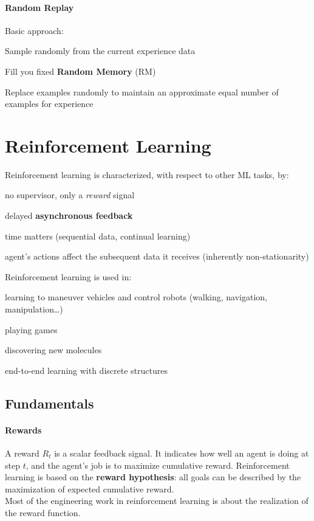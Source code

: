 \documentclass[10pt]{report}
\begin{document}
\paragraph{Random Replay} Basic approach:
\begin{list}{}{}
	\item Sample randomly from the current experience data
	\item Fill you fixed \textbf{Random Memory} (RM)
	\item Replace examples randomly to maintain an approximate equal number of examples for experience
\end{list}
\section{Reinforcement Learning}
Reinforcement learning is characterized, with respect to other ML tasks, by:
\begin{list}{}{}
	\item no supervisor, only a \textit{reward} signal
	\item delayed \textbf{asynchronous feedback}
	\item time matters (sequential data, continual learning)
	\item agent's actions affect the subsequent data it receives (inherently non-stationarity)
\end{list}
Reinforcement learning is used in:
\begin{list}{}{}
	\item learning to maneuver vehicles and control robots (walking, navigation, manipulation\ldots)
	\item playing games
	\item discovering new molecules
	\item end-to-end learning with discrete structures
\end{list}
\subsection{Fundamentals}
\paragraph{Rewards} A reward $R_t$ is a scalar feedback signal. It indicates how well an agent is doing at step $t$, and the agent's job is to maximize cumulative reward. Reinforcement learning is based on the \textbf{reward hypothesis}: all goals can be described by the maximization of expected cumulative reward.\\
Most of the engineering work in reinforcement learning is about the realization of the reward function.
\end{document}
